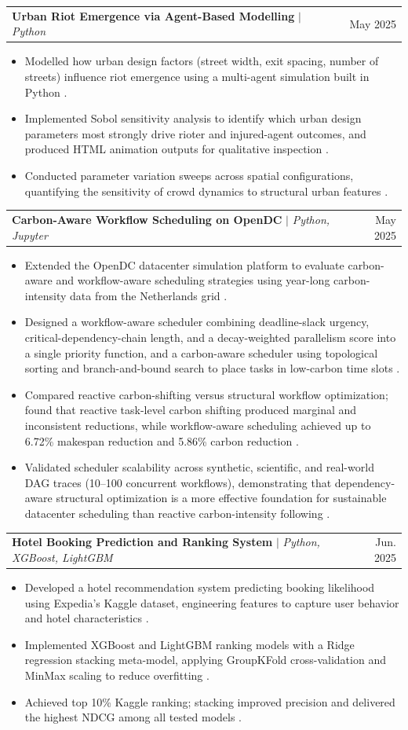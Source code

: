 \documentclass[letterpaper,11pt]{article}
\makeatletter
\newcommand{\resumeItem}[1]{
  \item\small{
    {#1 \vspace{-2pt}}
  }
}
\newcommand{\resumeProjectHeading}[2]{
    \item
    \begin{tabular*}{0.97\textwidth}{l@{\extracolsep{\fill}}r}
      \small#1 & #2 \\
    \end{tabular*}\vspace{-7pt}
}
\newcommand{\resumeItemListStart}{\begin{itemize}}
\newcommand{\resumeItemListEnd}{\end{itemize}\vspace{-5pt}}
\makeatother
\begin{document}
      \resumeProjectHeading
          {\textbf{Urban Riot Emergence via Agent-Based Modelling} $|$ \emph{Python} }{May 2025}
          \resumeItemListStart
            \resumeItem{Modelled how urban design factors (street width, exit spacing, number of streets) influence riot emergence using a multi-agent simulation built in Python .}
            \resumeItem{Implemented Sobol sensitivity analysis to identify which urban design parameters most strongly drive rioter and injured-agent outcomes, and produced HTML animation outputs for qualitative inspection .}
            \resumeItem{Conducted parameter variation sweeps across spatial configurations, quantifying the sensitivity of crowd dynamics to structural urban features .}
          \resumeItemListEnd

      \resumeProjectHeading
          {\textbf{Carbon-Aware Workflow Scheduling on OpenDC} $|$ \emph{Python, Jupyter}}{May 2025}
          \resumeItemListStart
            \resumeItem{Extended the OpenDC datacenter simulation platform to evaluate carbon-aware and workflow-aware scheduling strategies using year-long carbon-intensity data from the Netherlands grid .}
            \resumeItem{Designed a workflow-aware scheduler combining deadline-slack urgency, critical-dependency-chain length, and a decay-weighted parallelism score into a single priority function, and a carbon-aware scheduler using topological sorting and branch-and-bound search to place tasks in low-carbon time slots .}
            \resumeItem{Compared reactive carbon-shifting versus structural workflow optimization; found that reactive task-level carbon shifting produced marginal and inconsistent reductions, while workflow-aware scheduling achieved up to 6.72\% makespan reduction and 5.86\% carbon reduction .}
            \resumeItem{Validated scheduler scalability across synthetic, scientific, and real-world DAG traces (10--100 concurrent workflows), demonstrating that dependency-aware structural optimization is a more effective foundation for sustainable datacenter scheduling than reactive carbon-intensity following .}
          \resumeItemListEnd

      \resumeProjectHeading
          {\textbf{Hotel Booking Prediction and Ranking System} $|$ \emph{Python, XGBoost, LightGBM}}{Jun. 2025}
          \resumeItemListStart
            \resumeItem{Developed a hotel recommendation system predicting booking likelihood using Expedia's Kaggle dataset, engineering features to capture user behavior and hotel characteristics .}
            \resumeItem{Implemented XGBoost and LightGBM ranking models with a Ridge regression stacking meta-model, applying GroupKFold cross-validation and MinMax scaling to reduce overfitting .}
            \resumeItem{Achieved top 10\% Kaggle ranking; stacking improved precision and delivered the highest NDCG among all tested models .}
          \resumeItemListEnd
\end{document}
